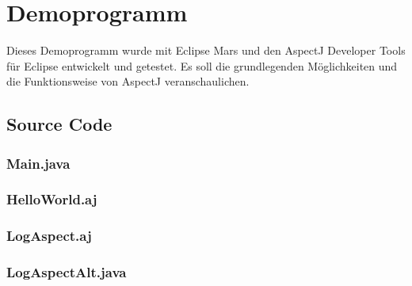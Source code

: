 \chapter{Demoprogramm}
\label{chap:demoprogramm}
Dieses Demoprogramm wurde mit Eclipse Mars und den AspectJ Developer Tools für Eclipse entwickelt und getestet. Es soll die grundlegenden Möglichkeiten und die Funktionsweise von AspectJ veranschaulichen.

\section{Source Code}
\label{demo_source}

\subsection{Main.java}


\subsection{HelloWorld.aj}


\subsection{LogAspect.aj}


\subsection{LogAspectAlt.java}

